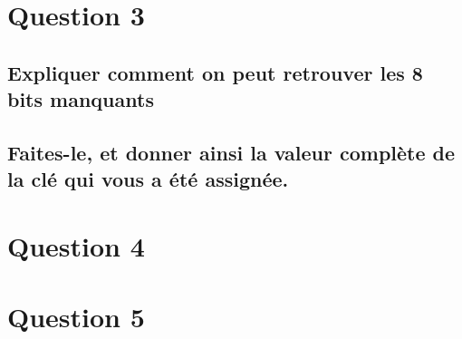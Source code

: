 \documentclass[a4paper,11pt]{article}
\begin{document}
	\section{Question 3}
	\subsection{Expliquer comment on peut retrouver les 8 bits manquants}
	\subsection{Faites-le, et donner ainsi la valeur complète de la clé qui vous a été assignée.}
	
	\section{Question 4}
	
	\section{Question 5}
\end{document}
